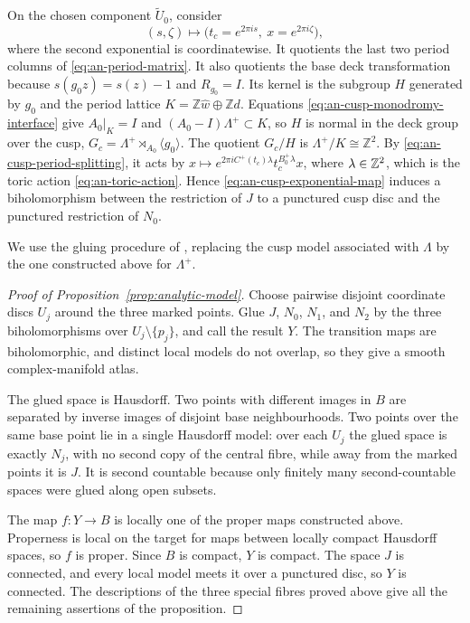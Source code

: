 On the chosen component $\widetilde U_0$, consider
\begin{equation}\label{eq:an-cusp-exponential-map}
 (s,\zeta)\longmapsto
 \bigl(t_c=e^{2\pi is},\ x=e^{2\pi i\zeta}\bigr),
\end{equation}
where the second exponential is coordinatewise.  It quotients the last two
period columns of \eqref{eq:an-period-matrix}.  It also quotients the base
deck transformation because $s(g_0z)=s(z)-1$ and
$R_{g_0}=I$.  Its kernel is the subgroup $H$ generated
by $g_0$ and the period lattice
$K=\mathbb Z\widehat w\oplus\mathbb Zd$.  Equations
\eqref{eq:an-cusp-monodromy-interface} give
$A_0|_K=I$ and $(A_0-I)\Lambda^+\subset K$, so $H$ is normal in the
deck group over the cusp,
$G_c=\Lambda^+\rtimes_{A_0}\langle g_0\rangle$.  The quotient
$G_c/H$ is $\Lambda^+/K\cong\mathbb Z^2$.  By
\eqref{eq:an-cusp-period-splitting}, it acts by
$x\longmapsto e^{2\pi iC^+(t_c)\lambda}
t_c^{B_0^+\lambda}x$, where $\lambda\in\mathbb Z^2$,
which is the toric action \eqref{eq:an-toric-action}.  Hence
\eqref{eq:an-cusp-exponential-map} induces a biholomorphism between the
restriction of $J$ to a punctured cusp disc and the punctured restriction
of $N_0$.

We use the gluing procedure of \citep[Construction~6.1]{Alpoge2026},
replacing the cusp model associated with $\Lambda$ by the one constructed
above for $\Lambda^+$.

\begin{proof}[Proof of Proposition~\ref{prop:analytic-model}]
Choose pairwise disjoint coordinate discs $U_j$ around the three marked
points.  Glue $J$, $N_0$, $N_1$, and $N_2$ by the three
biholomorphisms over $U_j\setminus\{p_j\}$, and call the result
$Y$.  The transition maps are biholomorphic, and distinct local models do
not overlap, so they give a smooth complex-manifold atlas.

The glued space is Hausdorff.  Two points with different images in $B$
are separated by inverse images
of disjoint base neighbourhoods.  Two points over the same base point lie
in a single Hausdorff model: over each $U_j$ the glued space is exactly
$N_j$, with no second copy of the central fibre, while away from the
marked points it is $J$.  It is second countable because only finitely many
second-countable spaces were glued along open subsets.

The map $f:Y\to B$ is locally one of the proper maps constructed above.
Properness is local on the target for maps between locally compact
Hausdorff spaces, so $f$ is proper.  Since $B$ is compact, $Y$ is
compact.  The space $J$ is connected, and every local model meets it over a
punctured disc, so $Y$ is connected.  The descriptions of the three
special fibres proved above give all the remaining assertions of the
proposition.
\end{proof}
